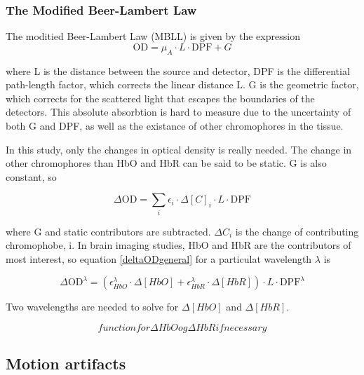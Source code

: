 \subsubsection{The Modified Beer-Lambert Law}
The moditied Beer-Lambert Law (MBLL) is given by the expression
\begin{equation}
\text{OD}=\mu_A \cdot L \cdot \text{DPF} + G
\end{equation}

where L is the distance between the source and detector, DPF is the differential path-length factor, which corrects the linear distance L. G is the geometric factor, which corrects for the scattered light that escapes the boundaries of the detectors. This absolute absorbtion is hard to measure due to the uncertainty of both G and DPF, as well as the existance of other chromophores in the tissue.

In this study, only the changes in optical density is really needed. The change in other chromophores than HbO and HbR can be said to be static. G is also constant, so 

\begin{equation} \label{sec:deltaODgeneral}
\Delta\text{OD}=\displaystyle\sum_{i} \epsilon_i \cdot \Delta [C]_i \cdot L \cdot \text{DPF}
\end{equation}

where G and static contributors are subtracted. $\Delta C_i$ is the change of contributing chromophobe, i. In brain imaging studies, HbO and HbR are the contributors of most interest, so equation \ref{deltaODgeneral} for a particulat wavelength $\lambda$ is

\begin{equation}
\Delta\text{OD}^{\lambda}= (\epsilon_{HbO}^{\lambda} \cdot \Delta [HbO] + \epsilon_{HbR}^{\lambda} \cdot \Delta [HbR]) \cdot L \cdot \text{DPF}^{\lambda}
\end{equation}

Two wavelengths are needed to solve for $\Delta [HbO]$ and $\Delta [HbR]$.

\begin{equation}
function for \Delta HbO og \Delta HbR if necessary
\end{equation}





\subsection{Motion artifacts} \label{sec:motionArtifact}

